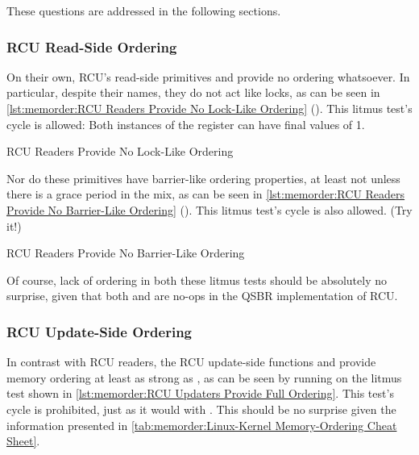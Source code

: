 These questions are addressed in the following sections.

\subsubsection{RCU Read-Side Ordering}
\label{sec:memorder:RCU Read-Side Ordering}

On their own, RCU's read-side primitives  and
 provide no ordering whatsoever.
In particular, despite their names, they do not act like locks, as can
be seen in
\cref{lst:memorder:RCU Readers Provide No Lock-Like Ordering}
().
This litmus test's cycle is allowed: Both instances of the 
register can have final values of 1.

\begin{listing}[tbp]

\caption{RCU Readers Provide No Lock-Like Ordering}
\label{lst:memorder:RCU Readers Provide No Lock-Like Ordering}
\end{listing}

Nor do these primitives have barrier-like ordering properties,
at least not unless there is a grace period in the mix, as can be seen in
\cref{lst:memorder:RCU Readers Provide No Barrier-Like Ordering}
().
This litmus test's cycle is also allowed.
(Try it!)

\begin{listing}[tbp]

\caption{RCU Readers Provide No Barrier-Like Ordering}
\label{lst:memorder:RCU Readers Provide No Barrier-Like Ordering}
\end{listing}

Of course, lack of ordering in both these litmus tests should be absolutely
no surprise, given that both  and 
are no-ops in the QSBR implementation of RCU\@.

\subsubsection{RCU Update-Side Ordering}
\label{sec:memorder:RCU Update-Side Ordering}

In contrast with RCU readers, the RCU update-side functions
 and 
provide memory ordering at least as strong as ,
as can be seen by running  on the litmus test shown in
\cref{lst:memorder:RCU Updaters Provide Full Ordering}.
This test's cycle is prohibited, just as it would with .
This should be no surprise given the information presented in
\cref{tab:memorder:Linux-Kernel Memory-Ordering Cheat Sheet}.

